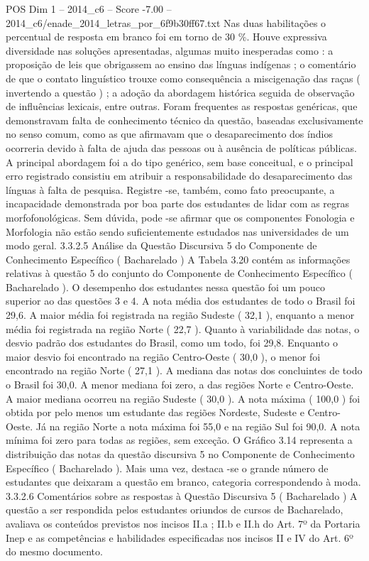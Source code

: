 \begin{textsample}{POS Dim 1 – 2014\_c6 – Score -7.00 – 2014\_c6/enade\_2014\_letras\_por\_6f9b30ff67.txt}
Nas duas habilitações o percentual de resposta em branco foi em torno de 30 \%.
Houve expressiva diversidade nas soluções apresentadas, algumas muito inesperadas como : a proposição de leis que obrigassem ao ensino das línguas indígenas ; o comentário de que o contato linguístico trouxe como consequência a miscigenação das raças ( invertendo a questão ) ; a adoção da abordagem histórica seguida de observação de influências lexicais, entre outras.
Foram frequentes as respostas genéricas, que demonstravam falta de conhecimento técnico da questão, baseadas exclusivamente no senso comum, como as que afirmavam que o desaparecimento dos índios ocorreria devido à falta de ajuda das pessoas ou à ausência de políticas públicas.
A principal abordagem foi a do tipo genérico, sem base conceitual, e o principal erro registrado consistiu em atribuir a responsabilidade do desaparecimento das línguas à falta de pesquisa.
Registre -se, também, como fato preocupante, a incapacidade demonstrada por boa parte dos estudantes de lidar com as regras morfofonológicas.
Sem dúvida, pode -se afirmar que os componentes Fonologia e Morfologia não estão sendo suficientemente estudados nas universidades de um modo geral. 3.3.2.5 Análise da Questão Discursiva 5 do Componente de Conhecimento Específico ( Bacharelado ) A Tabela 3.20 contém as informações relativas à questão 5 do conjunto do Componente de Conhecimento Específico ( Bacharelado ).
O desempenho dos estudantes nessa questão foi um pouco superior ao das questões 3 e 4.
A nota média dos estudantes de todo o Brasil foi 29,6.
A maior média foi registrada na região Sudeste ( 32,1 ), enquanto a menor média foi registrada na região Norte ( 22,7 ).
Quanto à variabilidade das notas, o desvio padrão dos estudantes do Brasil, como um todo, foi 29,8.
Enquanto o maior desvio foi encontrado na região Centro-Oeste ( 30,0 ), o menor foi encontrado na região Norte ( 27,1 ).
A mediana das notas dos concluintes de todo o Brasil foi 30,0.
A menor mediana foi zero, a das regiões Norte e Centro-Oeste.
A maior mediana ocorreu na região Sudeste ( 30,0 ).
A nota máxima ( 100,0 ) foi obtida por pelo menos um estudante das regiões Nordeste, Sudeste e Centro-Oeste.
Já na região Norte a nota máxima foi 55,0 e na região Sul foi 90,0.
A nota mínima foi zero para todas as regiões, sem exceção.
O Gráfico 3.14 representa a distribuição das notas da questão discursiva 5 no Componente de Conhecimento Específico ( Bacharelado ).
Mais uma vez, destaca -se o grande número de estudantes que deixaram a questão em branco, categoria correspondendo à moda. 3.3.2.6 Comentários sobre as respostas à Questão Discursiva 5 ( Bacharelado ) A questão a ser respondida pelos estudantes oriundos de cursos de Bacharelado, avaliava os conteúdos previstos nos incisos II.a ; II.b e II.h do Art. 7º da Portaria Inep e as competências e habilidades especificadas nos incisos II e IV do Art. 6º do mesmo documento.

\end{textsample}
